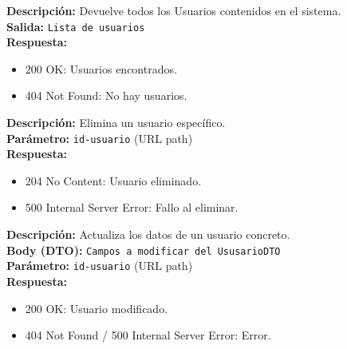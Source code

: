 \vspace{0.5em}

\begin{tcolorbox}[colback=blue!5!white, colframe=blue!75!black, title=\texttt{/usuarios/} -- GET]
\textbf{Descripción:} Devuelve todos los Usuarios contenidos en el sistema. \\
\textbf{Salida:} \texttt{Lista de usuarios} \\
\textbf{Respuesta:}
\begin{itemize}[label=--]
    \item 200 OK: Usuarios encontrados.
    \item 404 Not Found: No hay usuarios.
\end{itemize}
\end{tcolorbox}

\vspace{0.5em}

\begin{tcolorbox}[colback=blue!5!white, colframe=blue!75!black, title=\texttt{/usuario/delete/\{id-usuario\}} -- POST]
\textbf{Descripción:} Elimina un usuario específico. \\
\textbf{Parámetro:} \texttt{id-usuario} (URL path) \\
\textbf{Respuesta:}
\begin{itemize}[label=--]
    \item 204 No Content: Usuario eliminado.
    \item 500 Internal Server Error: Fallo al eliminar.
\end{itemize}
\end{tcolorbox}

\vspace{0.5em}

\begin{tcolorbox}[colback=blue!5!white, colframe=blue!75!black, title=\texttt{/usuario/\{id-usuario\}} -- PATCH]
\textbf{Descripción:} Actualiza los datos de un usuario concreto. \\
\textbf{Body (DTO):} \texttt{Campos a modificar del UsusarioDTO} \\
\textbf{Parámetro:} \texttt{id-usuario} (URL path) \\
\textbf{Respuesta:}
\begin{itemize}[label=--]
    \item 200 OK: Usuario modificado.
    \item 404 Not Found / 500 Internal Server Error: Error.
\end{itemize}
\end{tcolorbox}

